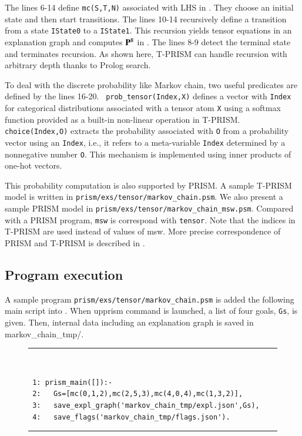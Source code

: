 \documentclass[a4paper]{report}
\newcommand{\mmat}[1]{\mathbf{#1}}
\begin{document}
The   lines  6-14   define   {\tt  mc(S,T,N)}   associated  with   LHS
in .   They choose  an initial  state and  then start
transitions.  The lines  10-14 recursively define a  transition from a
state {\tt IState0} to a  {\tt IState1}.  This recursion yields tensor
equations  in an  explanation  graph and  computes $\mmat{P}^{\tt  N}$
in .   The lines  8-9 detect  the terminal  state and
terminates  recursion.  As  shown here,  T-PRISM can  handle recursion
with arbitrary depth thanks to Prolog search.

To deal  with the discrete  probability like Markov chain,  two useful
predicates    are    defined    by     the    lines    16-20.     {\tt
	prob\_tensor(Index,X)}  defines   a  vector   with  {\tt   Index}  for
categorical distributions associated with a  tensor atom {\tt X} using
a  softmax function  provided as  a built-in  non-linear operation  in
T-PRISM.   {\tt choice(Index,O)}  extracts the  probability associated
with {\tt O} from a probability  vector using an {\tt Index}, i.e., it
refers  to a  meta-variable {\tt  Index} determined  by a  nonnegative
number {\tt O}.  This mechanism is implemented using inner products of
one-hot vectors.

This probability computation is also supported by PRISM.
A sample T-PRISM model is written in {\tt prism/exs/tensor/markov\_chain.psm}.
We also present a sample PRISM model in {\tt prism/exs/tensor/markov\_chain\_msw.psm}. 
Compared with a PRISM program, {\tt msw} is correspond with {\tt tensor}.
Note that the indices in T-PRISM are used instead of values of msw.
More precise correspondence of PRISM and T-PRISM is described in .

\subsection*{Program execution}

A sample program {\tt prism/exs/tensor/markov\_chain.psm} is added the following main script into .
When upprism command is launched, a list of four goals, {\tt Gs}, is given.
Then, internal data including an explanation graph is saved in {markov\_chain\_tmp/}.

\begin{figure}[h]
	\rule{0.85\textwidth}{0.10mm}\\ [-1em]
\begin{verbatim}
 1: prism_main([]):-
 2:   Gs=[mc(0,1,2),mc(2,5,3),mc(4,0,4),mc(1,3,2)],
 3:   save_expl_graph('markov_chain_tmp/expl.json',Gs),
 4:   save_flags('markov_chain_tmp/flags.json').	
\end{verbatim}
\rule{0.85\textwidth}{0.10mm}\\ [-1em]
\end{figure}
\end{document}
